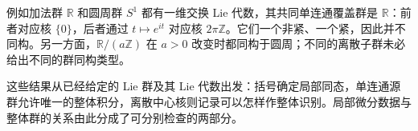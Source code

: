 例如加法群 \(\mathbb R\) 和圆周群 \(S^1\) 都有一维交换 Lie 代数，其共同单连通覆盖群是 \(\mathbb R\)：前者对应核 \(\{0\}\)，后者通过 \(t\mapsto e^{it}\) 对应核 \(2\pi\mathbb Z\)。它们一个非紧、一个紧，因此并不同构。另一方面，\(\mathbb R/(a\mathbb Z)\) 在 \(a>0\) 改变时都同构于圆周；不同的离散子群未必给出不同的群同构类型。

\ProseParagraphBreak

这些结果从已经给定的 Lie 群及其 Lie 代数出发：括号确定局部同态，单连通源群允许唯一的整体积分，离散中心核则记录可以怎样作整体识别。局部微分数据与整体群的关系由此分成了可分别检查的两部分。

